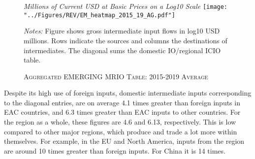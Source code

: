 \documentclass[a4paper]{article}
\begin{document}
\begin{figure}[h!] \vspace{-1mm}
\centering
\caption{\label{fig:wld}\textsc{Aggregated EMERGING MRIO Table: 2015-2019 Average}}
\small{\textit{Millions of Current USD at Basic Prices on a Log10 Scale}}
\texttt{[image: "../Figures/REV/EM\_heatmap\_2015\_19\_AG.pdf"]} \\ %
\raggedright
\scriptsize
\emph{Notes:} Figure shows gross intermediate input flows in log10 USD millions. Rows indicate the sources and columns the destinations of intermediates. The diagonal sums the domestic IO/regional ICIO table. 
\end{figure}
\FloatBarrier

Despite its high use of foreign inputs, domestic intermediate inputs corresponding to the diagonal entries, are on average 4.1 times greater than foreign inputs in EAC countries, and 6.3 times greater than EAC inputs to other countries. For the region as a whole, these figures are 4.6 and 6.13, respectively. This is low compared to other major regions, which produce and trade a lot more within themselves. For example, in the EU and North America, inputs from the region are around 10 times greater than foreign inputs. For China it is 14 times. \newline  %
\end{document}
